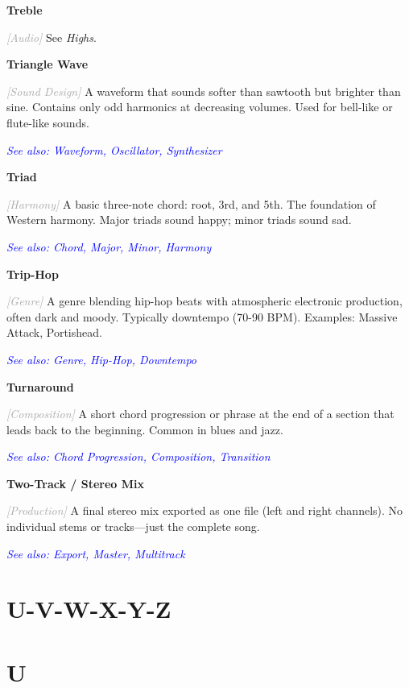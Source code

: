\documentclass[11pt,letterpaper]{article}
\newcommand{\term}[1]{\textbf{\large\color{purple}#1}}
\newcommand{\category}[1]{\textcolor{darkgray}{\textit{\small [#1]}}}
\newcommand{\seealso}[1]{\textcolor{blue}{\textit{See also: #1}}}
\newenvironment{termdef}[1]
  {\noindent\term{#1}\par\nopagebreak}
  {\par\vspace{0.3em}}
\begin{document}
\begin{termdef}{Treble}
\category{Audio}
See \textit{Highs}.
\end{termdef}

\begin{termdef}{Triangle Wave}
\category{Sound Design}
A waveform that sounds softer than sawtooth but brighter than sine. Contains only odd harmonics at decreasing volumes. Used for bell-like or flute-like sounds.

\seealso{Waveform, Oscillator, Synthesizer}
\end{termdef}

\begin{termdef}{Triad}
\category{Harmony}
A basic three-note chord: root, 3rd, and 5th. The foundation of Western harmony. Major triads sound happy; minor triads sound sad.

\seealso{Chord, Major, Minor, Harmony}
\end{termdef}

\begin{termdef}{Trip-Hop}
\category{Genre}
A genre blending hip-hop beats with atmospheric electronic production, often dark and moody. Typically downtempo (70-90 BPM). Examples: Massive Attack, Portishead.

\seealso{Genre, Hip-Hop, Downtempo}
\end{termdef}

\begin{termdef}{Turnaround}
\category{Composition}
A short chord progression or phrase at the end of a section that leads back to the beginning. Common in blues and jazz.

\seealso{Chord Progression, Composition, Transition}
\end{termdef}

\begin{termdef}{Two-Track / Stereo Mix}
\category{Production}
A final stereo mix exported as one file (left and right channels). No individual stems or tracks—just the complete song.

\seealso{Export, Master, Multitrack}
\end{termdef}

\newpage

\section*{U-V-W-X-Y-Z}

\section*{U}
\end{document}
